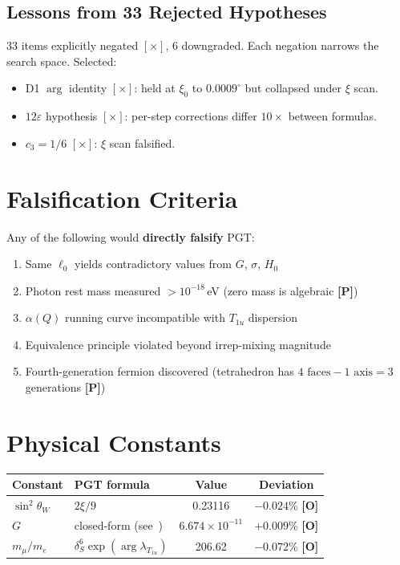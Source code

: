 \documentclass[11pt,a4paper]{article}
\newcommand{\gradeP}{\textbf{[P]}}
\newcommand{\gradeO}{\textbf{[O]}}
\begin{document}
\subsection{Lessons from 33 Rejected Hypotheses}
33 items explicitly negated $[\times]$, 6 downgraded. Each negation narrows the search space. Selected:
\begin{itemize}[nosep]
\item D1 $\arg$ identity $[\times]$: held at $\xi_0$ to $0.0009^\circ$ but collapsed under $\xi$ scan.
\item $12\varepsilon$ hypothesis $[\times]$: per-step corrections differ $10\times$ between formulas.
\item $c_3 = 1/6$ $[\times]$: $\xi$ scan falsified.
\end{itemize}

\section{Falsification Criteria}\label{sec:falsification}

Any of the following would \textbf{directly falsify} PGT:
\begin{enumerate}[nosep]
\item Same $\ell_0$ yields contradictory values from $G$, $\sigma$, $H_0$
\item Photon rest mass measured $> 10^{-18}$\,eV (zero mass is algebraic \gradeP)
\item $\alpha(Q)$ running curve incompatible with $T_{1u}$ dispersion
\item Equivalence principle violated beyond irrep-mixing magnitude
\item Fourth-generation fermion discovered (tetrahedron has $4\text{ faces}-1\text{ axis}=3$ generations \gradeP)
\end{enumerate}

\section{Physical Constants}\label{sec:constants}

\begin{center}
\begin{tabular}{llcc}
\toprule
Constant & PGT formula & Value & Deviation \\
\midrule
$\sin^2\theta_W$ & $2\xi/9$ & 0.23116 & $-0.024\%$ \gradeO \\
$G$ & closed-form (see~\cite{NIST}) & $6.674\times 10^{-11}$ & $+0.009\%$ \gradeO \\
$m_\mu/m_e$ & $\delta_S^6\exp(\arg\lambda_{T_{1u}})$ & 206.62 & $-0.072\%$ \gradeO \\
\bottomrule
\end{tabular}
\end{center}
\end{document}
